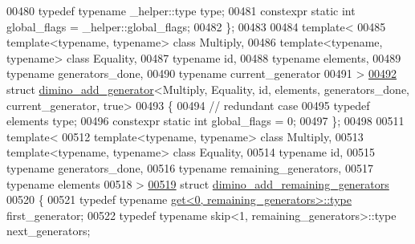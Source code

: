 \begin{DoxyCode}
00480   \textcolor{keyword}{typedef} \textcolor{keyword}{typename} \_helper::type type;
00481   constexpr \textcolor{keyword}{static} \textcolor{keywordtype}{int} global\_flags = \_helper::global\_flags;
00482 \};
00483 
00484 \textcolor{keyword}{template}<
00485   \textcolor{keyword}{template}<\textcolor{keyword}{typename}, \textcolor{keyword}{typename}> \textcolor{keyword}{class }Multiply,
00486   \textcolor{keyword}{template}<\textcolor{keyword}{typename}, \textcolor{keyword}{typename}> \textcolor{keyword}{class }Equality,
00487   \textcolor{keyword}{typename} id,
00488   \textcolor{keyword}{typename} elements,
00489   \textcolor{keyword}{typename} generators\_done,
00490   \textcolor{keyword}{typename} current\_generator
00491 >
\hyperlink{struct_eigen_1_1internal_1_1group__theory_1_1dimino__add__generator_3_01_multiply_00_01_equality1109fbb0e963fbe870ce5c0363b21d03}{00492} \textcolor{keyword}{struct }\hyperlink{struct_eigen_1_1internal_1_1group__theory_1_1dimino__add__generator}{dimino\_add\_generator}<Multiply, Equality, id, elements, generators\_done, 
      current\_generator, true>
00493 \{
00494   \textcolor{comment}{// redundant case}
00495   \textcolor{keyword}{typedef} elements type;
00496   constexpr \textcolor{keyword}{static} \textcolor{keywordtype}{int} global\_flags = 0;
00497 \};
00498 
00511 \textcolor{keyword}{template}<
00512   \textcolor{keyword}{template}<\textcolor{keyword}{typename}, \textcolor{keyword}{typename}> \textcolor{keyword}{class }Multiply,
00513   \textcolor{keyword}{template}<\textcolor{keyword}{typename}, \textcolor{keyword}{typename}> \textcolor{keyword}{class }Equality,
00514   \textcolor{keyword}{typename} id,
00515   \textcolor{keyword}{typename} generators\_done,
00516   \textcolor{keyword}{typename} remaining\_generators,
00517   \textcolor{keyword}{typename} elements
00518 >
\hyperlink{struct_eigen_1_1internal_1_1group__theory_1_1dimino__add__remaining__generators}{00519} \textcolor{keyword}{struct }\hyperlink{struct_eigen_1_1internal_1_1group__theory_1_1dimino__add__remaining__generators}{dimino\_add\_remaining\_generators}
00520 \{
00521   \textcolor{keyword}{typedef} \textcolor{keyword}{typename} \hyperlink{struct_eigen_1_1internal_1_1get}{get<0, remaining\_generators>::type} first\_generator;
00522   \textcolor{keyword}{typedef} \textcolor{keyword}{typename} skip<1, remaining\_generators>::type next\_generators;

\end{DoxyCode}
